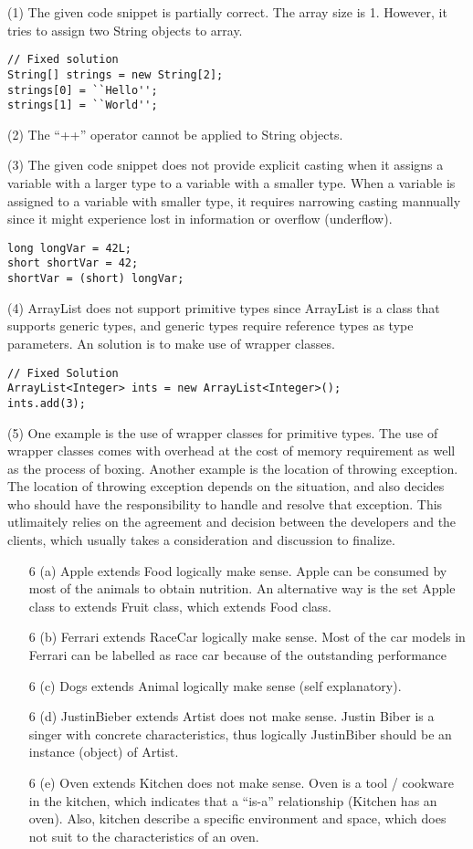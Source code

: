 \documentclass{article}
\begin{document}
(1) The given code snippet is partially correct. The array size is 1. However, it tries to assign two String objects to array.
\begin{lstlisting}
// Fixed solution
String[] strings = new String[2];
strings[0] = ``Hello'';
strings[1] = ``World'';
\end{lstlisting}

(2) The ``++'' operator cannot be applied to String objects.

(3) The given code snippet does not provide explicit casting when it assigns a variable with a larger type to a variable with a smaller type. When a variable is assigned to a variable with smaller type, it requires narrowing casting mannually since it might experience lost in information or overflow (underflow).
\begin{lstlisting}
long longVar = 42L;
short shortVar = 42;
shortVar = (short) longVar;
\end{lstlisting}

(4) ArrayList does not support primitive types since ArrayList is a class that supports generic types, and generic types require reference types as type parameters. An solution is to make use of wrapper classes.
\begin{lstlisting}
// Fixed Solution
ArrayList<Integer> ints = new ArrayList<Integer>();
ints.add(3);
\end{lstlisting}

(5) One example is the use of wrapper classes for primitive types. The use of wrapper classes comes with overhead at the cost of memory requirement as well as the process of boxing. Another example is the location of throwing exception. The location of throwing exception depends on the situation, and also decides who should have the responsibility to handle and resolve that exception. This utlimaitely relies on the agreement and decision between the developers and the clients, which usually takes a consideration and discussion to finalize. 

\begin{enumerate}
\item[6 (a)] Apple extends Food logically make sense. Apple can be consumed by most of the animals to obtain nutrition. An alternative way is the set Apple class to extends Fruit class, which extends Food class.
\item[6 (b)] Ferrari extends RaceCar logically make sense. Most of the car models in Ferrari can be labelled as race car because of the outstanding performance
\item[6 (c)] Dogs extends Animal logically make sense (self explanatory).
\item[6 (d)] JustinBieber extends Artist does not make sense. Justin Biber is a singer with concrete characteristics, thus logically JustinBiber should be an instance (object) of Artist.
\item[6 (e)] Oven extends Kitchen does not make sense. Oven is a tool / cookware in the kitchen, which indicates that a ``is-a'' relationship (Kitchen has an oven). Also, kitchen describe a specific environment and space, which does not suit to the characteristics of an oven.
\end{enumerate}
\end{document}
